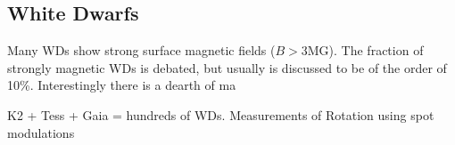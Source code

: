 {\color{red} \subsection{White Dwarfs}}
Many WDs show strong surface magnetic fields ($B>$3MG). The fraction of strongly magnetic WDs is debated, but usually is discussed to be of the order of 10\%. Interestingly there is a dearth of ma 

K2 + Tess + Gaia = hundreds of WDs. Measurements of Rotation using spot modulations